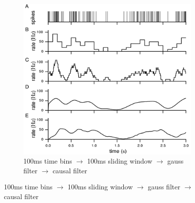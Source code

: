 \documentclass[english,11pt]{article}
\begin{document}
\begin{itemize}
\begin{figure}[H]
\begin{subfigure}[b]{0.5\textwidth}
				\includegraphics[width=\textwidth]{firing-rate.png}
				\caption{100ms time bins $\rightarrow$ 100ms sliding window $\rightarrow$ gauss filter $\rightarrow$ causal filter}
        \end{subfigure}
\end{figure}
\end{itemize}
\end{document}
